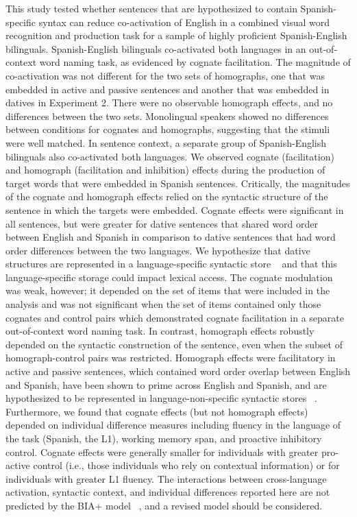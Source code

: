 This study tested whether sentences that are hypothesized to contain Spanish-specific syntax can reduce co-activation of English in a combined visual word recognition and production task for a sample of highly proficient Spanish-English bilinguals. Spanish-English bilinguals co-activated both languages in an out-of-context word naming task, as evidenced by cognate facilitation. The magnitude of co-activation was not different for the two sets of homographs, one that was embedded in active and passive sentences and another that was embedded in datives in Experiment 2. There were no observable homograph effects, and no differences between the two sets. Monolingual speakers showed no differences between conditions for cognates and homographs, suggesting that the stimuli were well matched. In sentence context, a separate group of Spanish-English bilinguals also co-activated both languages. We observed cognate (facilitation) and homograph (facilitation and inhibition) effects during the production of target words that were embedded in Spanish sentences. Critically, the magnitudes of the cognate and homograph effects relied on the syntactic structure of the sentence in which the targets were embedded. Cognate effects were significant in all sentences, but were greater for dative sentences that shared word order between English and Spanish in comparison to dative sentences that had word order differences between the two languages. We hypothesize that dative structures are represented in a language-specific syntactic store ~\citep[e.g.,][]{Bernolet2007, Loebell2003} and that this language-specific storage could impact lexical access. The cognate modulation was weak, however; it depended on the set of items that were included in the analysis and was not significant when the set of items contained only those cognates and control pairs which demonstrated cognate facilitation in a separate out-of-context word naming task. In contrast, homograph effects robustly depended on the syntactic construction of the sentence, even when the subset of homograph-control pairs was restricted. Homograph effects were facilitatory in active and passive sentences, which contained word order overlap between English and Spanish, have been shown to prime across English and Spanish, and are hypothesized to be represented in language-non-specific syntactic stores ~\citep{Hartsuiker2004}. Furthermore, we found that cognate effects (but not homograph effects) depended on individual difference measures including fluency in the language of the task (Spanish, the L1), working memory span, and proactive inhibitory control. Cognate effects were generally smaller for individuals with greater pro-active control (i.e., those individuals who rely on contextual information) or for individuals with greater L1 fluency. The interactions between cross-language activation, syntactic context, and individual differences reported here are not predicted by the BIA+ model ~\citep{Dijkstra2002}, and a revised model should be considered.

